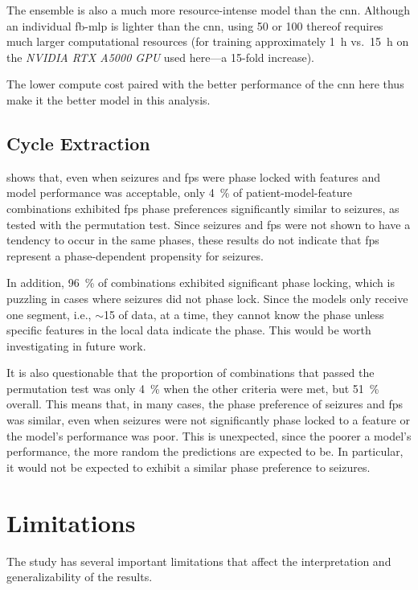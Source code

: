 The ensemble is also a much more resource-intense model than the \gls{cnn}.
Although an individual \gls{fb-mlp} is lighter than the \gls{cnn}, using 50 or 100 thereof requires much larger computational resources (for training approximately \SI{1}{\hour} vs.\ \SI{15}{\hour} on the \textit{NVIDIA RTX A5000 GPU} used here---a 15-fold increase).

The lower compute cost paired with the better performance of the \gls{cnn} here thus make it the better model in this analysis.

\subsection{Cycle Extraction}\label{subsec:discussion-cycle-extraction}
 shows that, even when seizures and \glspl{fp} were phase locked with features and model performance was acceptable, only \SI{4}{\percent} of patient-model-feature combinations exhibited \glspl{fp} phase preferences significantly similar to seizures, as tested with the permutation test.
Since seizures and \glspl{fp} were not shown to have a tendency to occur in the same phases, these results do not indicate that \glspl{fp} represent a phase-dependent propensity for seizures.

In addition, \SI{96}{\percent} of combinations exhibited significant phase locking, which is puzzling in cases where seizures did not phase lock.
Since the models only receive one segment, i.e., $\sim$\SI{15}{\sec} of data, at a time, they cannot know the phase unless specific features in the local data indicate the phase.
This would be worth investigating in future work.

It is also questionable that the proportion of combinations that passed the permutation test was only \SI{4}{\percent} when the other criteria were met, but \SI{51}{\percent} overall.
This means that, in many cases, the phase preference of seizures and \glspl{fp} was similar, even when seizures were not significantly phase locked to a feature or the model's performance was poor.
This is unexpected, since the poorer a model's performance, the more random the predictions are expected to be.
In particular, it would not be expected to exhibit a similar phase preference to seizures.


\section{Limitations}
The study has several important limitations that affect the interpretation and generalizability of the results.

